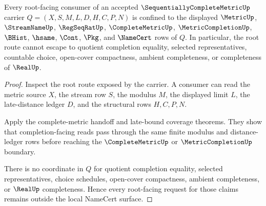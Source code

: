 \begin{theorem}
\label{thm:sequentially-complete-metric-root-nonescape}
Every root-facing consumer of an accepted $\SequentiallyCompleteMetricUp$ carrier $Q=(X,S,M,L,D,H,C,P,N)$ is confined to the displayed $\MetricUp$, $\StreamNameUp$, $\RegSeqRatUp$, $\CompleteMetricUp$, $\MetricCompletionUp$, $\BHist$, $\hsame$, $\Cont$, $\Pkg$, and $\NameCert$ rows of $Q$. In particular, the root route cannot escape to quotient completion equality, selected representatives, countable choice, open-cover compactness, ambient completeness, or completeness of $\RealUp$.
\end{theorem}
\begin{proof}
Inspect the root route exposed by the carrier. A consumer can read the metric source $X$, the stream row $S$, the modulus $M$, the displayed limit $L$, the late-distance ledger $D$, and the structural rows $H,C,P,N$.

Apply the complete-metric handoff and late-bound coverage theorems. They show that completion-facing reads pass through the same finite modulus and distance-ledger rows before reaching the $\CompleteMetricUp$ or $\MetricCompletionUp$ boundary.

There is no coordinate in $Q$ for quotient completion equality, selected representatives, choice schedules, open-cover compactness, ambient completeness, or $\RealUp$ completeness. Hence every root-facing request for those claims remains outside the local NameCert surface.
\end{proof}

